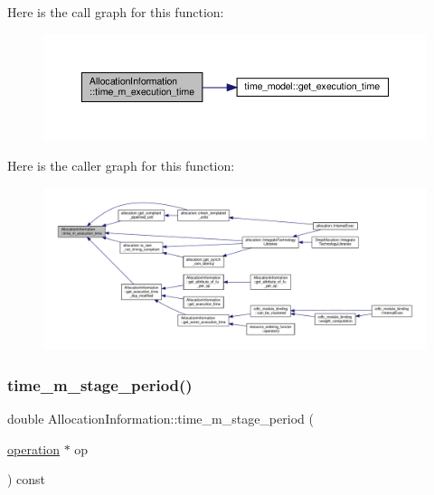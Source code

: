 Here is the call graph for this function\+:
\nopagebreak
\begin{figure}[H]
\begin{center}
\leavevmode
\includegraphics[width=350pt]{d7/d79/classAllocationInformation_a30a7b6425810143360160ce414f96e58_cgraph}
\end{center}
\end{figure}
Here is the caller graph for this function\+:
\nopagebreak
\begin{figure}[H]
\begin{center}
\leavevmode
\includegraphics[width=350pt]{d7/d79/classAllocationInformation_a30a7b6425810143360160ce414f96e58_icgraph}
\end{center}
\end{figure}
\mbox{\label{classAllocationInformation_affde532d961cc0d77553c6ce12e0cc6b}} 
\subsubsection{\texorpdfstring{time\+\_\+m\+\_\+stage\+\_\+period()}{time\_m\_stage\_period()}}
{\footnotesize\ttfamily double Allocation\+Information\+::time\+\_\+m\+\_\+stage\+\_\+period (\begin{DoxyParamCaption}\item[{\hyperlink{structoperation}{operation} $\ast$}]{op }\end{DoxyParamCaption}) const\hspace{0.3cm}{\ttfamily [private]}}



